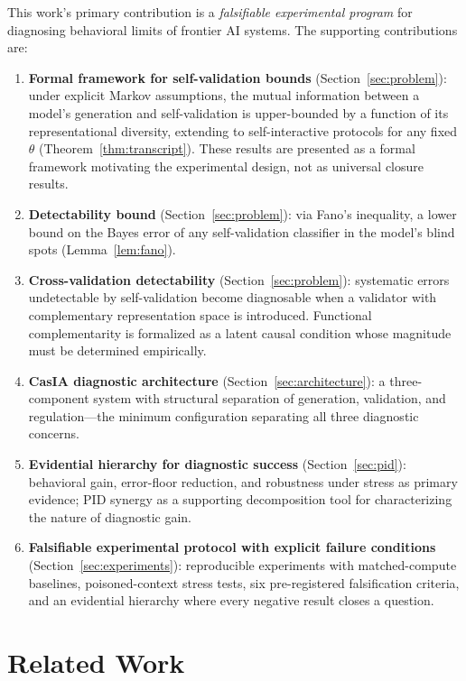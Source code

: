 \documentclass[11pt,a4paper]{article}
\theoremstyle{definition}
\begin{document}
This work's primary contribution is a \emph{falsifiable experimental program} for diagnosing behavioral limits of frontier AI systems. The supporting contributions are:
\begin{enumerate}[leftmargin=*,itemsep=3pt]
\item \textbf{Formal framework for self-validation bounds} (Section~\ref{sec:problem}): under explicit Markov assumptions, the mutual information between a model's generation and self-validation is upper-bounded by a function of its representational diversity, extending to self-interactive protocols for any fixed $\theta$ (Theorem~\ref{thm:transcript}). These results are presented as a formal framework motivating the experimental design, not as universal closure results.
\item \textbf{Detectability bound} (Section~\ref{sec:problem}): via Fano's inequality, a lower bound on the Bayes error of any self-validation classifier in the model's blind spots (Lemma~\ref{lem:fano}).
\item \textbf{Cross-validation detectability} (Section~\ref{sec:problem}): systematic errors undetectable by self-validation become diagnosable when a validator with complementary representation space is introduced. Functional complementarity is formalized as a latent causal condition whose magnitude must be determined empirically.
\item \textbf{CasIA diagnostic architecture} (Section~\ref{sec:architecture}): a three-component system with structural separation of generation, validation, and regulation---the minimum configuration separating all three diagnostic concerns.
\item \textbf{Evidential hierarchy for diagnostic success} (Section~\ref{sec:pid}): behavioral gain, error-floor reduction, and robustness under stress as primary evidence; PID synergy as a supporting decomposition tool for characterizing the nature of diagnostic gain.
\item \textbf{Falsifiable experimental protocol with explicit failure conditions} (Section~\ref{sec:experiments}): reproducible experiments with matched-compute baselines, poisoned-context stress tests, six pre-registered falsification criteria, and an evidential hierarchy where every negative result closes a question.
\end{enumerate}


\section{Related Work}
\label{sec:related}
\end{document}
